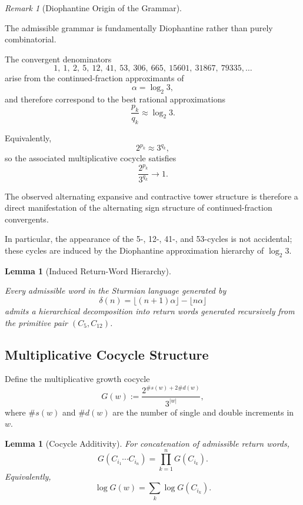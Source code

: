 \documentclass[12pt, oneside]{article}
\numberwithin{equation}{section}
\theoremstyle{definition}
\theoremstyle{plain}
\newtheorem{lemma}[theorem]{Lemma}
\theoremstyle{remark}
\newtheorem*{remark}{Remark}
\begin{document}
\begin{remark}[Diophantine Origin of the Grammar]
\label{rem:diophantine-grammar}

The admissible grammar is fundamentally Diophantine rather than
purely combinatorial.

The convergent denominators
\[
1,\ 1,\ 2,\ 5,\ 12,\ 41,\ 53,\ 306,\ 665,\ 15601,\ 31867,\ 79335,\ldots
\]
arise from the continued-fraction approximants of
\[
\alpha=\log_2 3,
\]
and therefore correspond to the best rational approximations
\[
\frac{p_k}{q_k}\approx \log_2 3.
\]

Equivalently,
\[
2^{p_k}\approx 3^{q_k},
\]
so the associated multiplicative cocycle satisfies
\[
\frac{2^{p_k}}{3^{q_k}}\to1.
\]

The observed alternating expansive and contractive tower structure is
therefore a direct manifestation of the alternating sign structure of
continued-fraction convergents.

In particular, the appearance of the 5-, 12-, 41-, and 53-cycles
is not accidental; these cycles are induced by the Diophantine
approximation hierarchy of $\log_2 3$.
\end{remark}

\begin{lemma}[Induced Return-Word Hierarchy]
\label{lem:induced-hierarchy}

Every admissible word in the Sturmian language generated by
\[
\delta(n)=\lfloor (n+1)\alpha\rfloor-\lfloor n\alpha\rfloor
\]
admits a hierarchical decomposition into return words generated
recursively from the primitive pair $(C_5, C_{12})$.
\end{lemma}

\noindent


\subsection{Multiplicative Cocycle Structure}

Define the multiplicative growth cocycle
\[
G(w) := \frac{2^{\#s(w) + 2\#d(w)}}{3^{|w|}},
\]
where $\#s(w)$ and $\#d(w)$ are the number of single and double increments in $w$.

\begin{lemma}[Cocycle Additivity]
For concatenation of admissible return words,
\[
G(C_{i_1} \cdots C_{i_n}) = \prod_{k=1}^n G(C_{i_k}).
\]
Equivalently,
\[
\log G(w) = \sum_{k} \log G(C_{i_k}).
\]
\end{lemma}
\end{document}
